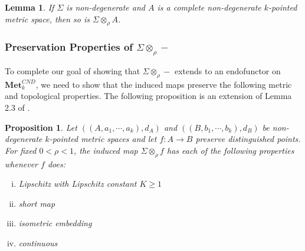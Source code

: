 \documentclass{sn-jnl}%
\theoremstyle{thmstyleone}%
\newtheorem{proposition}[theorem]{Proposition}%
\newtheorem{lemma}[theorem]{Lemma}%
\theoremstyle{thmstyletwo}%
\theoremstyle{thmstylethree}%
\newcommand{\mcnd}{\mathbf{Met}_{k}^{CND}}
\newcommand{\M}{\Sigma}
\newcommand{\Fw}{\M\otimes_{\w}}
\newcommand{\A}{\left(A, a_1 ,\cdots , a_k\right)}
\newcommand{\B}{\left(B, b_1, \cdots, b_k \right)}
\newcommand{\w}{\rho}
\begin{document}
\begin{lemma}
\label{Lem_FPreservesCompleteness}
    If $\Sigma$ is non-degenerate and $A$ is a complete non-degenerate $k$-pointed metric space, then so is $\Fw A$.
\end{lemma}

\subsubsection{Preservation Properties of $\Fw-$}
 To complete our goal of showing that $\Fw-$ extends to an endofunctor on $\mcnd$, we need to show that the induced maps preserve the following metric and topological properties. The following proposition is an extension of Lemma 2.3 of \cite{Sierpinski_gasket}.

\begin{proposition}
\label{Pro_PreservationProperties}
    Let $(\A, d_A)$ and $(\B, d_B)$ be non-degenerate $k$-pointed metric spaces and let $f:A \rightarrow B$ preserve distinguished points. For fixed $0<\rho<1$, the induced map $\Fw f$ has each of the following properties whenever $f$ does:
    \begin{enumerate}[(i)]
        \item \label{Lip} Lipschitz with Lipschitz constant $K\geq 1$
        \item \label{short} short map
        \item \label{isometry} isometric embedding
        \item \label{continuity} continuous
    \end{enumerate}
\end{proposition}
\end{document}
